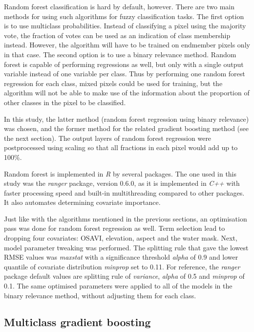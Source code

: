 \documentclass[a4paper,12pt]{scrbook}
\begin{document}
Random forest classification is hard by default, however. There are two main methods for using such algorithms for fuzzy classification tasks. The first option is to use multiclass probabilities. Instead of classifying a pixel using the majority vote, the fraction of votes can be used as an indication of class membership instead. However, the algorithm will have to be trained on endmember pixels only in that case. The second option is to use a binary relevance method. Random forest is capable of performing regressions as well, but only with a single output variable instead of one variable per class. Thus by performing one random forest regression for each class, mixed pixels could be used for training, but the algorithm will not be able to make use of the information about the proportion of other classes in the pixel to be classified.

In this study, the latter method (random forest regression using binary relevance) was chosen, and the former method for the related gradient boosting method (see the next section). The output layers of random forest regression were postprocessed using scaling so that all fractions in each pixel would add up to 100\%.

Random forest is implemented in \textit{R} by several packages. The one used in this study was the \textit{ranger} package, version 0.6.0, as it is implemented in \textit{C++} with faster processing speed and built-in multithreading compared to other packages. It also automates determining covariate importance.

Just like with the algorithms mentioned in the previous sections, an optimisation pass was done for random forest regression as well. Term selection lead to dropping four covariates: OSAVI, elevation, aspect and the water mask. Next, model parameter tweaking was performed. The splitting rule that gave the lowest RMSE values was \textit{maxstat} with a significance threshold \textit{alpha} of 0.9 and lower quantile of covariate distribution \textit{minprop} set to 0.11. For reference, the \textit{ranger} package default values are splitting rule of \textit{variance}, \textit{alpha} of 0.5 and \textit{minprop} of 0.1. The same optimised parameters were applied to all of the models in the binary relevance method, without adjusting them for each class.

\subsection{Multiclass gradient boosting}
\end{document}
